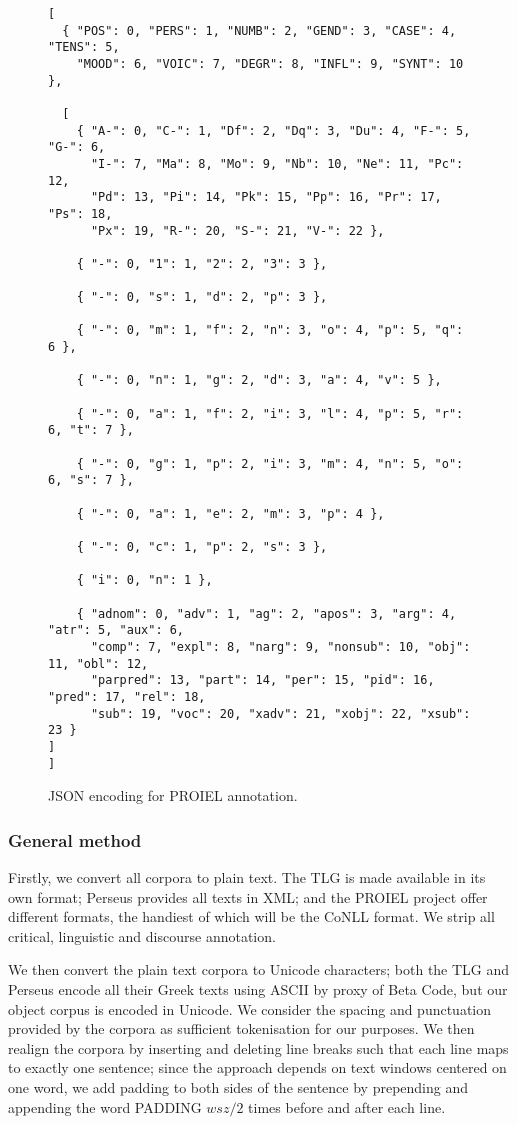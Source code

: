 \begin{figure}
\begin{verbatim}
[
  { "POS": 0, "PERS": 1, "NUMB": 2, "GEND": 3, "CASE": 4, "TENS": 5, 
    "MOOD": 6, "VOIC": 7, "DEGR": 8, "INFL": 9, "SYNT": 10 },

  [
    { "A-": 0, "C-": 1, "Df": 2, "Dq": 3, "Du": 4, "F-": 5, "G-": 6, 
      "I-": 7, "Ma": 8, "Mo": 9, "Nb": 10, "Ne": 11, "Pc": 12, 
      "Pd": 13, "Pi": 14, "Pk": 15, "Pp": 16, "Pr": 17, "Ps": 18, 
      "Px": 19, "R-": 20, "S-": 21, "V-": 22 },

    { "-": 0, "1": 1, "2": 2, "3": 3 },

    { "-": 0, "s": 1, "d": 2, "p": 3 },

    { "-": 0, "m": 1, "f": 2, "n": 3, "o": 4, "p": 5, "q": 6 },

    { "-": 0, "n": 1, "g": 2, "d": 3, "a": 4, "v": 5 },

    { "-": 0, "a": 1, "f": 2, "i": 3, "l": 4, "p": 5, "r": 6, "t": 7 },

    { "-": 0, "g": 1, "p": 2, "i": 3, "m": 4, "n": 5, "o": 6, "s": 7 },

    { "-": 0, "a": 1, "e": 2, "m": 3, "p": 4 },

    { "-": 0, "c": 1, "p": 2, "s": 3 },

    { "i": 0, "n": 1 },

    { "adnom": 0, "adv": 1, "ag": 2, "apos": 3, "arg": 4, "atr": 5, "aux": 6, 
      "comp": 7, "expl": 8, "narg": 9, "nonsub": 10, "obj": 11, "obl": 12, 
      "parpred": 13, "part": 14, "per": 15, "pid": 16, "pred": 17, "rel": 18, 
      "sub": 19, "voc": 20, "xadv": 21, "xobj": 22, "xsub": 23 }
]
]
\end{verbatim}
\caption{JSON encoding for PROIEL annotation.}
\end{figure}
\subsubsection{General method}
\label{sec:supcorp}
Firstly, we convert all corpora to plain text. The TLG is made
available in its own format; Perseus provides all texts in XML; and
the PROIEL project offer different formats, the handiest of which will
be the CoNLL format. We strip all critical, linguistic and discourse
annotation.

We then convert the plain text corpora to Unicode characters; both the
TLG and Perseus encode all their Greek texts using ASCII by proxy of
Beta Code, but our object corpus is encoded in Unicode. We consider
the spacing and punctuation provided by the corpora as sufficient
tokenisation for our purposes. We then realign the corpora by
inserting and deleting line breaks such that each line maps to exactly
one sentence; since the approach depends on text windows centered on
one word, we add padding to both sides of the sentence by prepending
and appending the word PADDING $wsz / 2$ times before and after each
line.

